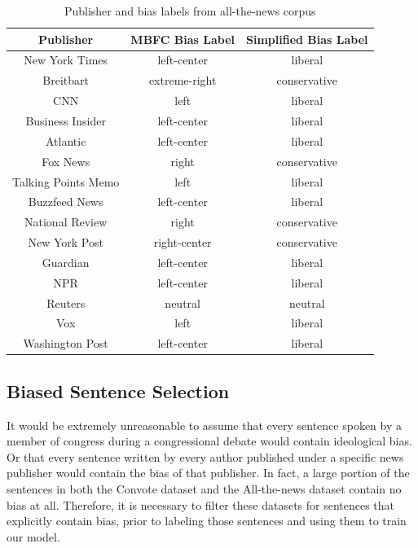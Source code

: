 \documentclass[10pt,a4paper,onecolumn]{article}
\begin{document}
\begin{table}[h!]
	\begin{center}
		\caption{Publisher and bias labels from all-the-news corpus}
		\label{tab:pub-bias}
		\begin{tabular}{c|c|c}
			\hline\hline
			\textbf{Publisher} & \textbf{MBFC Bias Label} & \textbf{Simplified Bias Label} \\
			\hline
			New York Times & left-center & liberal \\
			\rowcolor{Gray}
			Breitbart & extreme-right & conservative \\
			\rowcolor{Gray}
			CNN & left & liberal \\
			Business Insider & left-center & liberal \\
			Atlantic & left-center & liberal \\
			\rowcolor{Gray}
			Fox News & right & conservative \\
			\rowcolor{Gray}
			Talking Points Memo & left & liberal \\
			Buzzfeed News & left-center & liberal \\
			National Review & right & conservative \\
			New York Post & right-center & conservative \\
			Guardian & left-center & liberal \\
			NPR & left-center & liberal \\
			Reuters & neutral & neutral \\
			\rowcolor{Gray}
			Vox & left & liberal \\
			Washington Post & left-center & liberal \\
			\hline\hline
		\end{tabular}
	\end{center}
\end{table}

\subsection{Biased Sentence Selection}
\label{sec:filtering}
It would be extremely unreasonable to assume that every sentence spoken by a member of congress during a congressional debate would contain ideological bias. Or that every sentence written by every author published under a specific news publisher would contain the bias of that publisher. In fact, a large portion of the sentences in both the Convote dataset and the All-the-news dataset contain no bias at all. Therefore, it is necessary to filter these datasets for sentences that explicitly contain bias, prior to labeling those sentences and using them to train our model.
\end{document}
